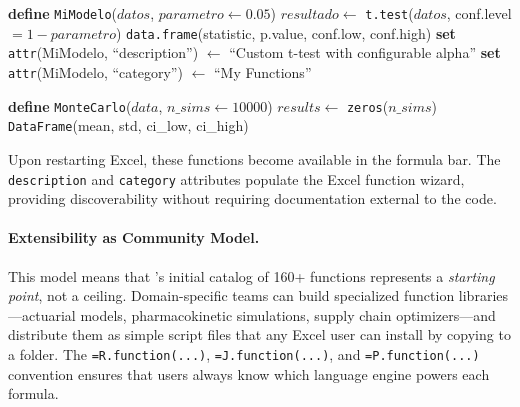 \begin{algorithm}[htbp]
\SetAlgoLined
{}
\BlankLine
\textbf{define} \texttt{MiModelo}($datos$, $parametro \leftarrow 0.05$)\;
\Indp
    $resultado \leftarrow$ \texttt{t.test}($datos$, conf.level $= 1 - parametro$)\;
    \Return \texttt{data.frame}(statistic, p.value, conf.low, conf.high)\;
\Indm
\BlankLine
\textbf{set} \texttt{attr}(MiModelo, ``description'') $\leftarrow$ ``Custom t-test with configurable alpha''\;
\textbf{set} \texttt{attr}(MiModelo, ``category'') $\leftarrow$ ``My Functions''\;
\caption{User-Defined R Function (automatically exposed as \texttt{=R.MiModelo(...)})}
\label{alg:user_r}
\end{algorithm}

\begin{algorithm}[htbp]
\SetAlgoLined
{}
\BlankLine
\textbf{define} \texttt{MonteCarlo}($data$, $n\_sims \leftarrow 10000$)\;
\Indp
    $results \leftarrow$ \texttt{zeros}($n\_sims$)\;
    \Return \texttt{DataFrame}(mean, std, ci\_low, ci\_high)\;
\Indm
\caption{User-Defined Julia Function (automatically exposed as \texttt{=J.MonteCarlo(...)})}
\label{alg:user_jl}
\end{algorithm}

Upon restarting Excel, these functions become available in the formula bar. The \texttt{description} and \texttt{category} attributes populate the Excel function wizard, providing discoverability without requiring documentation external to the code.

\paragraph{Extensibility as Community Model.}
This model means that \neven{}'s initial catalog of 160+ functions represents a \emph{starting point}, not a ceiling. Domain-specific teams can build specialized function libraries---actuarial models, pharmacokinetic simulations, supply chain optimizers---and distribute them as simple script files that any Excel user can install by copying to a folder. The \texttt{=R.function(...)}, \texttt{=J.function(...)}, and \texttt{=P.function(...)} convention ensures that users always know which language engine powers each formula.

